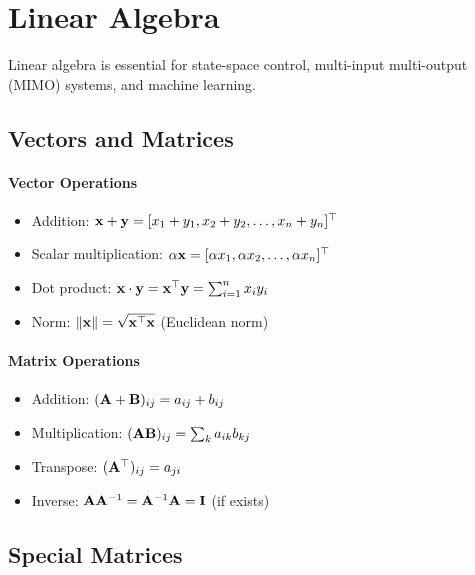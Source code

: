 \chapter{Linear Algebra}
\label{ch:linear_algebra}

Linear algebra is essential for state-space control, multi-input multi-output (MIMO) systems, and machine learning.

\section{Vectors and Matrices}

\subsubsection{Vector Operations}
\begin{itemize}
    \item Addition: $\mathbf{x} + \mathbf{y} = [x_1+y_1, x_2+y_2, \ldots, x_n+y_n]^\top$
    \item Scalar multiplication: $\alpha\mathbf{x} = [\alpha x_1, \alpha x_2, \ldots, \alpha x_n]^\top$
    \item Dot product: $\mathbf{x} \cdot \mathbf{y} = \mathbf{x}^\top\mathbf{y} = \sum_{i=1}^n x_i y_i$
    \item Norm: $\|\mathbf{x}\| = \sqrt{\mathbf{x}^\top\mathbf{x}}$ (Euclidean norm)
\end{itemize}



\subsubsection{Matrix Operations}
\begin{itemize}
    \item Addition: $(\mathbf{A} + \mathbf{B})_{ij} = a_{ij} + b_{ij}$
    \item Multiplication: $(\mathbf{A}\mathbf{B})_{ij} = \sum_k a_{ik}b_{kj}$
    \item Transpose: $(\mathbf{A}^\top)_{ij} = a_{ji}$
    \item Inverse: $\mathbf{A}\mathbf{A}^{-1} = \mathbf{A}^{-1}\mathbf{A} = \mathbf{I}$ (if exists)
\end{itemize}



\section{Special Matrices}

